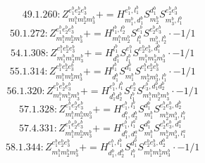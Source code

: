 \documentclass[letterpaper,10pt,fleqn,leqno,onecolumn]{article}
\begin{document}
\begin{equation} \;\;\;\;\;\;  49.1.260: Z^{e_{1}^{b}e_{2}^{b}e_{3}^{b}}_{m_{1}^{b}m_{2}^{b}m_{3}^{b}}+=H^{e_{1}^{b},l_{1}^{b}}_{m_{1}^{b},d_{1}^{b}}S^{d_{1}^{b}}_{m_{2}^{b}}S^{e_{2}^{b}e_{3}^{b}}_{m_{3}^{b},l_{1}^{b}} \end{equation}
\begin{equation} \;\;\;\;\;\;  50.1.272: Z^{e_{1}^{b}e_{2}^{b}e_{3}^{b}}_{m_{1}^{b}m_{2}^{b}m_{3}^{b}}+=H^{l_{1}^{b},l_{2}^{b}}_{m_{1}^{b}m_{2}^{b}}S^{e_{1}^{b}}_{l_{1}^{b}}S^{e_{2}^{b}e_{3}^{b}}_{m_{3}^{b},l_{2}^{b}}\cdot -1/1 \end{equation}
\begin{equation} \;\;\;\;\;\;  54.1.308: Z^{e_{1}^{b}e_{2}^{b}e_{3}^{b}}_{m_{1}^{b}m_{2}^{b}m_{3}^{b}}+=H^{l_{1}^{b}}_{d_{1}^{b}}S^{e_{1}^{b}}_{l_{1}^{b}}S^{e_{2}^{b}e_{3}^{b},d_{1}^{b}}_{m_{1}^{b}m_{2}^{b}m_{3}^{b}}\cdot -1/1 \end{equation}
\begin{equation} \;\;\;\;\;\;  55.1.314: Z^{e_{1}^{b}e_{2}^{b}e_{3}^{b}}_{m_{1}^{b}m_{2}^{b}m_{3}^{b}}+=H^{l_{1}^{b}}_{d_{1}^{b}}S^{d_{1}^{b}}_{m_{1}^{b}}S^{e_{1}^{b}e_{2}^{b}e_{3}^{b}}_{m_{2}^{b}m_{3}^{b},l_{1}^{b}}\cdot -1/1 \end{equation}
\begin{equation} \;\;\;\;\;\;  56.1.320: Z^{e_{1}^{b}e_{2}^{b}e_{3}^{b}}_{m_{1}^{b}m_{2}^{b}m_{3}^{b}}+=H^{e_{1}^{b},l_{1}^{b}}_{d_{1}^{b}d_{2}^{b}}S^{e_{2}^{b}}_{l_{1}^{b}}S^{e_{3}^{b},d_{1}^{b}d_{2}^{b}}_{m_{1}^{b}m_{2}^{b}m_{3}^{b}}\cdot -1/1 \end{equation}
\begin{equation} \;\;\;\;\;\;  57.1.328: Z^{e_{1}^{b}e_{2}^{b}e_{3}^{b}}_{m_{1}^{b}m_{2}^{b}m_{3}^{b}}+=H^{e_{1}^{b},l_{1}^{b}}_{d_{1}^{b},d_{2}^{b}}S^{d_{1}^{b}}_{m_{1}^{b}}S^{e_{2}^{b}e_{3}^{b},d_{2}^{b}}_{m_{2}^{b}m_{3}^{b},l_{1}^{b}} \end{equation}
\begin{equation} \;\;\;\;\;\;  57.4.331: Z^{e_{1}^{b}e_{2}^{b}e_{3}^{b}}_{m_{1}^{b}m_{2}^{b}m_{3}^{b}}+=H^{e_{1}^{b},l_{1}^{a}}_{d_{1}^{b},d_{1}^{a}}S^{d_{1}^{b}}_{m_{1}^{b}}S^{e_{2}^{b}e_{3}^{b},d_{1}^{a}}_{m_{2}^{b}m_{3}^{b},l_{1}^{a}} \end{equation}
\begin{equation} \;\;\;\;\;\;  58.1.344: Z^{e_{1}^{b}e_{2}^{b}e_{3}^{b}}_{m_{1}^{b}m_{2}^{b}m_{3}^{b}}+=H^{e_{1}^{b},l_{1}^{b}}_{d_{1}^{b},d_{2}^{b}}S^{d_{1}^{b}}_{l_{1}^{b}}S^{e_{2}^{b}e_{3}^{b},d_{2}^{b}}_{m_{1}^{b}m_{2}^{b}m_{3}^{b}}\cdot -1/1 \end{equation}
\end{document}
